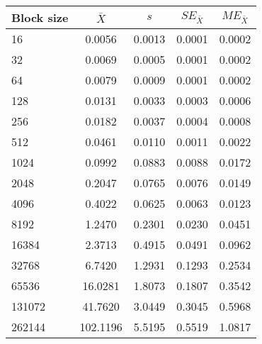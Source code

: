 \begin{tabular}{lcccc}\toprule
{\small Block size} & $\bar{X}$ & $s$ & $SE_{\bar{X}}$ & $ME_{\bar{X}}$ \\\midrule
16 & 0.0056 & 0.0013 & 0.0001 & 0.0002\\
32 & 0.0069 & 0.0005 & 0.0001 & 0.0002\\
64 & 0.0079 & 0.0009 & 0.0001 & 0.0002\\
128 & 0.0131 & 0.0033 & 0.0003 & 0.0006\\
256 & 0.0182 & 0.0037 & 0.0004 & 0.0008\\
512 & 0.0461 & 0.0110 & 0.0011 & 0.0022\\
1024 & 0.0992 & 0.0883 & 0.0088 & 0.0172\\
2048 & 0.2047 & 0.0765 & 0.0076 & 0.0149\\
4096 & 0.4022 & 0.0625 & 0.0063 & 0.0123\\
8192 & 1.2470 & 0.2301 & 0.0230 & 0.0451\\
16384 & 2.3713 & 0.4915 & 0.0491 & 0.0962\\
32768 & 6.7420 & 1.2931 & 0.1293 & 0.2534\\
65536 & 16.0281 & 1.8073 & 0.1807 & 0.3542\\
131072 & 41.7620 & 3.0449 & 0.3045 & 0.5968\\
262144 & 102.1196 & 5.5195 & 0.5519 & 1.0817\\
\bottomrule
\end{tabular}
